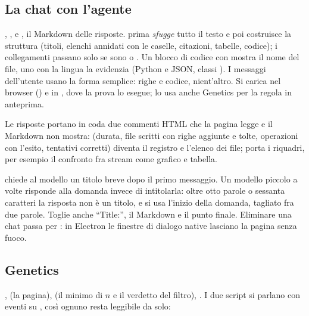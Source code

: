 \subsection{La chat con l'agente}

, ,
 e , il Markdown delle
risposte.  prima \emph{sfugge} tutto il testo e poi costruisce
la struttura (titoli, elenchi annidati con le caselle, citazioni, tabelle,
codice); i collegamenti passano solo se sono  o . Un
blocco di codice con  mostra il nome del file, uno con la
lingua la evidenzia (Python e JSON, classi ). I messaggi
dell'utente usano la forma semplice: righe e codice, nient'altro. Si carica
nel browser () e in , dove la prova lo esegue; lo
usa anche Genetics per la regola in anteprima.

Le risposte portano in coda due commenti HTML che la pagina legge e il
Markdown non mostra:  (durata, file scritti con
righe aggiunte e tolte, operazioni con l'esito, tentativi corretti) diventa
il registro e l'elenco dei file;  porta i
riquadri, per esempio il confronto fra stream come grafico e tabella.

 chiede al modello un titolo breve dopo il
primo messaggio. Un modello piccolo a volte risponde alla domanda invece di
intitolarla: oltre otto parole o sessanta caratteri la risposta non è un
titolo, e si usa l'inizio della domanda, tagliato fra due parole. Toglie
anche \enquote{Title:}, il Markdown e il punto finale. Eliminare una chat
passa per : in Electron le finestre di dialogo
native lasciano la pagina senza fuoco.

\subsection{Genetics}

,  (la pagina),
 (il minimo di $n$ e il verdetto del
filtro), . I due script si parlano con eventi su
, così ognuno resta leggibile da solo:

